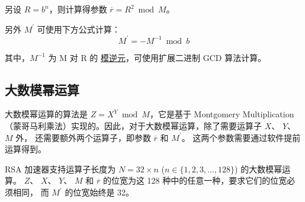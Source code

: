 \documentclass[main\_\_CN.tex]{subfiles}
\begin{document}
另设 \begin{math}R = b^{n}\end{math}，则计算得参数 \begin{math}\overline{r} = R^{2} \bmod M\end{math}。

另外 \begin{math}M^{\prime}\end{math} 可使用下方公式计算：
\[
        M^{\prime} = - M^{-1} \bmod b
\]

其中，$M^{-1}$ 为 M 对 R 的 \href{https://zh.wikipedia.org/wiki/\%E6\%A8\%A1\%E5\%8F\%8D\%E5\%85\%83\%E7\%B4\%A0}{模逆元}，可使用扩展二进制 GCD 算法计算。

\subsection{大数模幂运算} \label{sec:rsa-large-modular-Exponentiation}

大数模幂运算的算法是 \begin{math}Z = X^{Y} \bmod M\end{math}，它是基于 Montgomery Multiplication（蒙哥马利乘法）实现的。因此，对于大数模幂运算，除了需要运算子
\begin{math}X\end{math}、
\begin{math}Y\end{math}、
\begin{math}M\end{math} 外，
还需要额外两个运算子，即参数
\begin{math}\overline{r}\end{math} 和
\begin{math}M^{\prime}\end{math}。
这两个参数需要通过软件提前运算得到。

RSA 加速器支持运算子长度为
\begin{math}N = 32 \times n\end{math} (\begin{math}n \in \{ 1,2,3, \dots, 128\} \end{math}) 的大数模幂运算。
\begin{math}Z\end{math}、
\begin{math}X\end{math}、
\begin{math}Y\end{math}、
\begin{math}M\end{math} 和
\begin{math}\overline{r}\end{math}
的位宽为这 128 种中的任意一种，要求它们的位宽必须相同，
而 \begin{math}M^{\prime}\end{math} 的位宽始终是 32。
\end{document}
